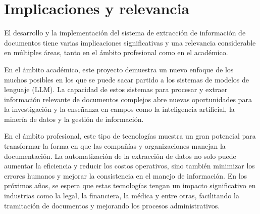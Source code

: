 \section{Implicaciones y relevancia}

El desarrollo y la implementación del sistema de extracción de información de documentos tiene varias implicaciones
significativas y una relevancia considerable en múltiples áreas, tanto en el ámbito profesional como en el académico.

En el ámbito académico, este proyecto demuestra un nuevo enfoque de los muchos posibles en los que se puede sacar
partido a los sistemas de modelos de lenguaje (LLM).
La capacidad de estos sistemas para procesar y extraer información relevante de documentos complejos abre nuevas
oportunidades para la investigación y la enseñanza en campos como la inteligencia artificial, la minería de datos y la
gestión de información.

En el ámbito profesional, este tipo de tecnologías muestra un gran potencial para transformar la forma en que las
compañías y organizaciones manejan la documentación.
La automatización de la extracción de datos no solo puede aumentar la eficiencia y reducir los costos operativos, sino
también minimizar los errores humanos y mejorar la consistencia en el manejo de información.
En los próximos años, se espera que estas tecnologías tengan un impacto significativo en
industrias como la legal, la financiera, la médica y entre otras, facilitando la tramitación de documentos y mejorando
los procesos administrativos.

